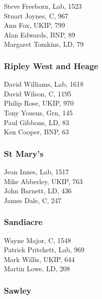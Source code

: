 \documentclass[a4paper,openany,10pt]{book}
\begin{document}


Steve Freeborn, Lab, 1523\\
Stuart Joynes, C, 967\\
Ann Fox, UKIP, 799\\
Alan Edwards, BNP, 89\\
Margaret Tomkins, LD, 79\\


\subsubsection*{Ripley West and Heage}



David Williams, Lab, 1618\\
David Wilson, C, 1195\\
Philip Rose, UKIP, 970\\
Tony Youens, Grn, 145\\
Paul Gibbons, LD, 83\\
Ken Cooper, BNP, 63\\


\subsubsection*{St Mary's}



Jean Innes, Lab, 1517\\
Mike Abberley, UKIP, 763\\
John Barnett, LD, 436\\
James Dale, C, 247\\


\subsubsection*{Sandiacre}



Wayne Major, C, 1548\\
Patrick Pritchett, Lab, 969\\
Mark Willis, UKIP, 644\\
Martin Lowe, LD, 208\\


\subsubsection*{Sawley}
\end{document}
